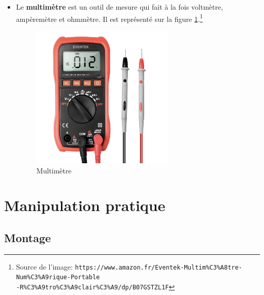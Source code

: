 \documentclass[a4paper]{article}
\begin{document}
\begin{itemize}
\item Le \textbf{multimètre} est un outil de mesure qui fait à la fois voltmètre, ampèremètre et ohmmètre. Il est représenté sur la figure \ref{fig:multimetre}.\footnote{Source de l'image: \texttt{https://www.amazon.fr/Eventek-Multim\%C3\%A8tre-Num\%C3\%A9rique-Portable} \\ \texttt{-R\%C3\%A9tro\%C3\%A9clair\%C3\%A9/dp/B07GSTZL1F}}

\begin{figure}%
    \centering
    \includegraphics[width=0.65\textwidth]{multimetre01.jpg}
    \caption{Multimètre}
    \label{fig:multimetre}
\end{figure}



\end{itemize}















\section{Manipulation pratique}










\subsection{Montage}
\end{document}
